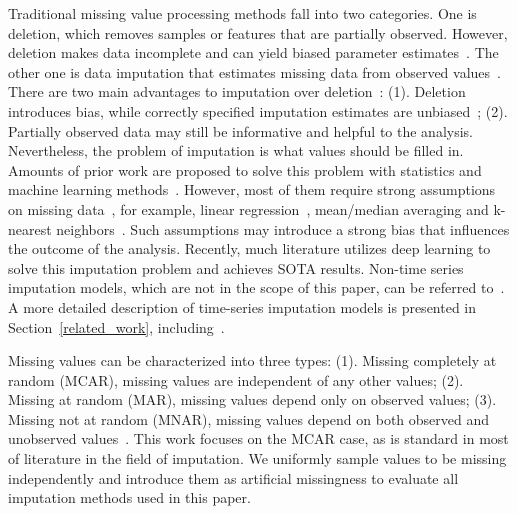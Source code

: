 \documentclass{article}
\begin{document}
Traditional missing value processing methods fall into two categories. One is deletion, which removes samples or features that are partially observed. However, deletion makes data incomplete and can yield biased parameter estimates~\cite{Graham2009MissingData}. The other one is data imputation that estimates missing data from observed values~\cite{Rubin1975MissingData}. There are two main advantages to imputation over deletion~\cite{Burgess2013Imputation}: (1). Deletion introduces bias, while correctly specified imputation estimates are unbiased~\cite{White2010Imputation}; (2). Partially observed data may still be informative and helpful to the analysis. Nevertheless, the problem of imputation is what values should be filled in. Amounts of prior work are proposed to solve this problem with statistics and machine learning methods~\cite{Yu2016Temporal, Ansley1984ARIMA,Acuna2004Missing,Kreindler2006MissingData, Wang2006Unifying, Fung2006Methods, Azur2011ChainedEquations}. However, most of them require strong assumptions on missing data~\cite{Cao2018BRITS}, for example, linear regression~\cite{Ansley1984ARIMA}, mean/median averaging and k-nearest neighbors~\cite{Acuna2004Missing}. Such assumptions may introduce a strong bias that influences the outcome of the analysis. Recently, much literature utilizes deep learning to solve this imputation problem and achieves SOTA results. Non-time series imputation models, which are not in the scope of this paper, can be referred to~\cite{Yoon2018GAIN, Li2018MisGAN, Lee2019CollaGAN, Yoon2020GAMIN,Richardson2020McFlow,Nazabal2020HIVAE, Wu2020AimNet, Mouselinos2021MAIN}. A more detailed description of time-series imputation models is presented in Section~\ref{related_work}, including~\cite{Cao2018BRITS, Yoon2019MRNN, Liu2019NAOMI, Luo2018GRUI, Luo2019E2GAN, Fortuin2020GPVAE, Ramchandran2021LVAE, Ashman2020SGPVAE, Ma2019CDSA, Bansal2021DeepMVI, Shan2021NRTSI}.

Missing values can be characterized into three types: (1). Missing completely at random (MCAR), missing values are independent of any other values; (2). Missing at random (MAR), missing values depend only on observed values; (3). Missing not at random (MNAR), missing values depend on both observed and unobserved values~\cite{Rubin1976Missing,Little1986MissingData}. This work focuses on the MCAR case, as is standard in most of literature in the field of imputation. We uniformly sample values to be missing independently and introduce them as artificial missingness to evaluate all imputation methods used in this paper.
\end{document}
